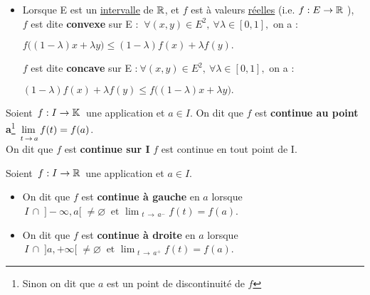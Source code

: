 \begin{itemize}[label=•]
    
    \item Lorsque E est un \underline{intervalle} de $\mathbb{R}$, et \(f\) est à valeurs \underline{réelles} (i.e. \(f : E\to \mathbb{R}\ \)),\vspace{0.1cm} \\
    \(f\) est dite \textbf{convexe} sur E \ssi : \( \ \forall (x,y) \in E^2,\ \forall \lambda \in [0,1],\) on a : \vspace{-0.3cm} 
    \begin{center}\(f\bigl((1-\lambda)x+\lambda y\bigr) \leq (1-\lambda)f(x) + \lambda f(y).\) \end{center} 
    \(f\) est dite \textbf{concave} sur E \ssi :\( \ \forall (x,y) \in E^2,\ \forall \lambda \in [0,1],\) on a : \vspace{-0.3cm} 
    \begin{center}\((1-\lambda)f(x) + \lambda f(y) \leq f\bigl((1-\lambda)x+\lambda y\bigr).\) \end{center}
\end{itemize}

\vspace{1cm}

Soient \(\,f:I\to\mathbb{K}\,\) une application et \(a\in I\). On dit que $f$ est \textbf{continue au point a}\footnote{Sinon on dit que $a$ est un point de discontinuité de $f$} \ssi \(\,\displaystyle \adjustlimits\lim_{t\,\to\,a} f(t)=f(a)\).\vspace{0.2cm}\\
On dit que $f$ est \textbf{continue sur I} \ssi $f$ est continue en tout point de I.

\vspace{1.2cm}

\noindent Soient \(\,f:I\to \mathbb{R}\,\) une application et \(a\in I\).
\begin{itemize}[leftmargin=1cm, label=•]
	\item On dit que $f$ est \textbf{continue à gauche} en $a$ lorsque \(\displaystyle \,I\,\cap\;]-\infty,a[\;\neq \varnothing \ \text{ et } \lim_{\ \,t\,\to\, a^-}f(t)=f(a)\).
	
	\item On dit que $f$ est \textbf{continue à droite} en $a$ lorsque \(\displaystyle \,I\,\cap\;]a,+\infty[\;\neq \varnothing \ \text{ et } \lim_{\ \,t\,\to\, a^+}f(t)=f(a)\). 

\end{itemize}

